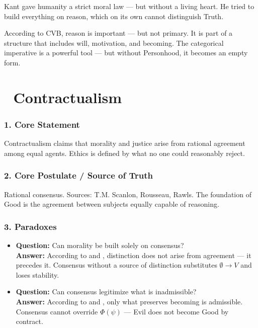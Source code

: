 \documentclass[12pt]{article}
\begin{document}
Kant gave humanity a strict moral law — but without a living heart. He tried to build everything on reason, which on its own cannot distinguish Truth.

According to CVB, reason is important — but not primary. It is part of a structure that includes will, motivation, and becoming. The categorical imperative is a powerful tool — but without Personhood, it becomes an empty form.

\section*{🔷 Contractualism}

\subsubsection*{1. Core Statement}

Contractualism claims that morality and justice arise from rational agreement among equal agents. Ethics is defined by what no one could reasonably reject.

\subsubsection*{2. Core Postulate / Source of Truth}

Rational consensus. Sources: T.M. Scanlon, Rousseau, Rawls. The foundation of Good is the agreement between subjects equally capable of reasoning.

\subsubsection*{3. Paradoxes}

\begin{itemize}
\item \textbf{Question:} Can morality be built solely on consensus?  
\\ \textbf{Answer:} According to \text{[1]} and \text{[4.1]}, distinction does not arise from agreement — it precedes it. Consensus without a source of distinction substitutes $\emptyset \rightarrow V$ and loses stability.

\item \textbf{Question:} Can consensus legitimize what is inadmissible?  
\\ \textbf{Answer:} According to \text{[3]} and \text{[11.1.1]}, only what preserves becoming is admissible. Consensus cannot override $\Phi(\psi)$ — Evil does not become Good by contract.
\end{itemize}
\end{document}
